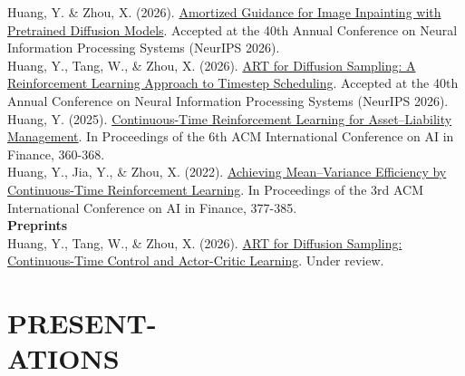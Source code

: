 \documentclass[margin, 10pt]{res} %
\begin{document}
\begin{resume}
Huang, Y. \& Zhou, X. (2026). \href{https://yiliehuang.github.io/files/AID_Inpaint_ArXiv.pdf}{Amortized Guidance for Image Inpainting with Pretrained Diffusion Models}. Accepted at the 40th Annual Conference on Neural Information Processing Systems (NeurIPS 2026).\\

Huang, Y., Tang, W., \& Zhou, X. (2026). \href{https://yiliehuang.github.io/files/ART_RL_ArXiv.pdf}{ART for Diffusion Sampling: A Reinforcement Learning Approach to Timestep Scheduling}. Accepted at the 40th Annual Conference on Neural Information Processing Systems (NeurIPS 2026).\\

Huang, Y. (2025). \href{https://dl.acm.org/doi/10.1145/3768292.3770337}{Continuous-Time Reinforcement Learning for Asset--Liability Management}. In Proceedings of the 6th ACM International Conference on AI in Finance, 360-368.\\

Huang, Y., Jia, Y., \& Zhou, X. (2022). \href{https://dl.acm.org/doi/abs/10.1145/3533271.3561760}{Achieving Mean--Variance Efficiency by Continuous-Time Reinforcement Learning}. In Proceedings of the 3rd ACM International Conference on AI in Finance, 377-385.\\

\enlargethispage{\baselineskip}
\textbf{Preprints}\\
Huang, Y., Tang, W., \& Zhou, X. (2026). \href{https://yiliehuang.github.io/files/ART_Control_Actor_Critic_ArXiv.pdf}{ART for Diffusion Sampling: Continuous-Time Control and Actor-Critic Learning}. Under review.\\









\section{PRESENT-\\ATIONS}



\end{resume}
\end{document}

